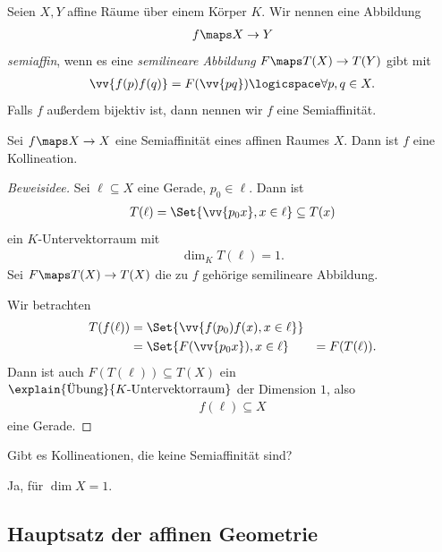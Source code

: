 \begin{definition*}
    Seien \( X,Y \) affine Räume über einem Körper \( K \). Wir nennen eine Abbildung
    \begin{align*}
        f\maps X\to Y
    \end{align*}
    \emph{semiaffin}, wenn es eine \emph{semilineare Abbildung} \( F\maps T(X)\to T(Y) \) gibt mit
    \begin{align*}
        \vv{f(p) f(q)}=F(\vv{pq})\logicspace \forall p,q\in X.
    \end{align*}
    Falls \( f \) außerdem bijektiv ist, dann nennen wir \( f \) eine Semiaffinität.
\end{definition*}
\begin{lemma}
    Sei \( f\maps X\to X \) eine Semiaffinität eines affinen Raumes \( X \). Dann ist \( f \) eine Kollineation.
\end{lemma}
\begin{proof}[Beweisidee]
    Sei \( \ell \subseteq X \) eine Gerade, \( p_0\in \ell \). Dann ist
    \begin{align*}
        T(\ell)=\Set{\vv{p_0 x}, x\in \ell}\subseteq T(x)
    \end{align*}
    ein \( K \)-Untervektorraum mit
    \begin{align*}
        \dim_K T(\ell)=1.
    \end{align*}
    Sei \( F\maps T(X)\to T(X)  \) die zu \( f \) gehörige semilineare Abbildung.

    Wir betrachten 
    \begin{align*}
        T(f(\ell))
        \begin{aligned}[t]
            &=\Set{\vv{f(p_0) f(x), x\in \ell}}\\
            &=\Set{F(\vv{p_0 x}), x\in \ell}
            &=F(T(\ell)).
        \end{aligned}        
    \end{align*}
    Dann ist auch \( F(T(\ell))\subseteq T(X) \) ein \( \explain{\text{Übung}}{K \text{-Untervektorraum}} \) der Dimension \( 1 \), also
    \begin{align*}
        f(\ell)\subseteq X
    \end{align*}
    eine Gerade.
\end{proof}
\begin{frage*}
    Gibt es Kollineationen, die keine Semiaffinität sind?
\end{frage*}
\tto Ja, \zb für \( \dim X=1 \).
\subsection*{Hauptsatz der affinen Geometrie}

